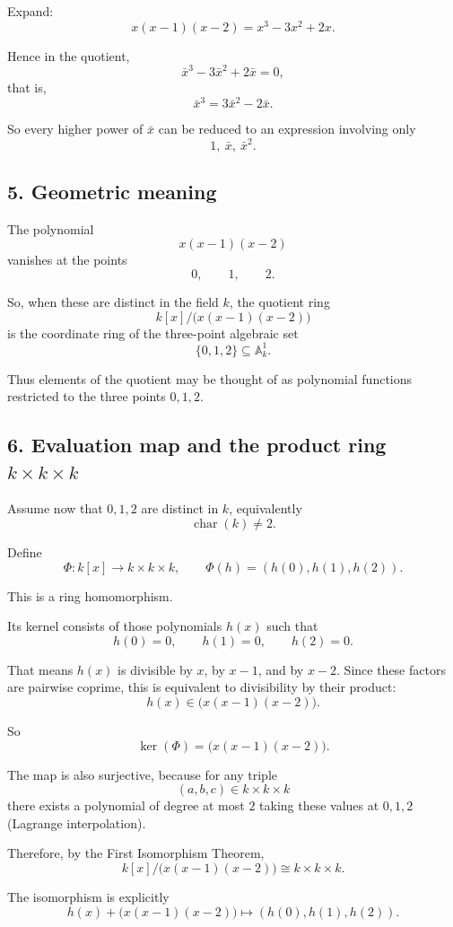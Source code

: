 \documentclass[12pt,a4paper]{article}
\theoremstyle{notespace}
\begin{document}
Expand:
\[
x(x-1)(x-2)=x^3-3x^2+2x.
\]

Hence in the quotient,
\[
\bar x^3-3\bar x^2+2\bar x=0,
\]
that is,
\[
\bar x^3=3\bar x^2-2\bar x.
\]

So every higher power of \(\bar x\) can be reduced to an expression involving only
\[
1,\ \bar x,\ \bar x^2.
\]

\subsection{5. Geometric meaning}

The polynomial
\[
x(x-1)(x-2)
\]
vanishes at the points
\[
0,\qquad 1,\qquad 2.
\]

So, when these are distinct in the field \(k\), the quotient ring
\[
k[x]/\bigl(x(x-1)(x-2)\bigr)
\]
is the coordinate ring of the three-point algebraic set
\[
\{0,1,2\}\subseteq \mathbb A_k^1.
\]

Thus elements of the quotient may be thought of as polynomial functions restricted to the three points \(0,1,2\).

\subsection{6. Evaluation map and the product ring \(k\times k\times k\)}

Assume now that \(0,1,2\) are distinct in \(k\), equivalently
\[
\operatorname{char}(k)\neq 2.
\]

Define
\[
\Phi:k[x]\longrightarrow k\times k\times k,
\qquad
\Phi(h)=(h(0),h(1),h(2)).
\]

This is a ring homomorphism.

Its kernel consists of those polynomials \(h(x)\) such that
\[
h(0)=0,\qquad h(1)=0,\qquad h(2)=0.
\]

That means \(h(x)\) is divisible by \(x\), by \(x-1\), and by \(x-2\). Since these factors are pairwise coprime, this is equivalent to divisibility by their product:
\[
h(x)\in \bigl(x(x-1)(x-2)\bigr).
\]

So
\[
\ker(\Phi)=\bigl(x(x-1)(x-2)\bigr).
\]

The map is also surjective, because for any triple
\[
(a,b,c)\in k\times k\times k
\]
there exists a polynomial of degree at most \(2\) taking these values at \(0,1,2\) (Lagrange interpolation).

Therefore, by the First Isomorphism Theorem,
\[
k[x]/\bigl(x(x-1)(x-2)\bigr)\cong k\times k\times k.
\]

The isomorphism is explicitly
\[
h(x)+\bigl(x(x-1)(x-2)\bigr)\longmapsto (h(0),h(1),h(2)).
\]
\end{document}
